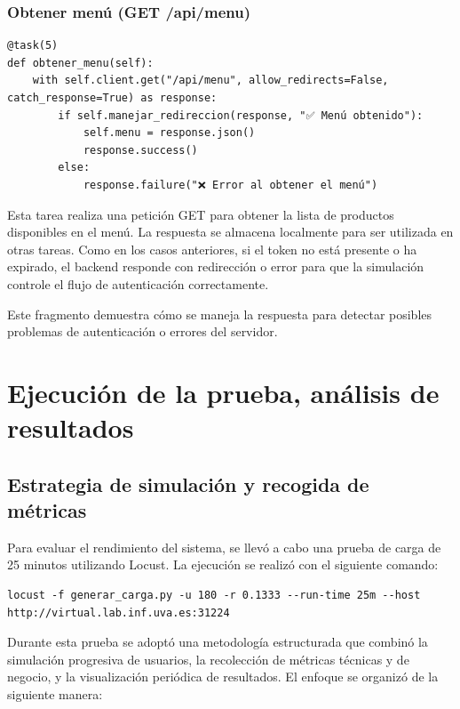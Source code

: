 \documentclass[10pt]{book}
\begin{document}
\subsubsection{Obtener menú (GET /api/menu)}

\begin{lstlisting}[style=pythonclean, caption={Tarea para obtener el menú de productos}]
@task(5)
def obtener_menu(self):
    with self.client.get("/api/menu", allow_redirects=False, catch_response=True) as response:
        if self.manejar_redireccion(response, "✅ Menú obtenido"):
            self.menu = response.json()
            response.success()
        else:
            response.failure("❌ Error al obtener el menú")
\end{lstlisting}

Esta tarea realiza una petición GET para obtener la lista de productos disponibles en el menú. La respuesta se almacena localmente para ser utilizada en otras tareas. Como en los casos anteriores, si el token no está presente o ha expirado, el backend responde con redirección o error para que la simulación controle el flujo de autenticación correctamente.


Este fragmento demuestra cómo se maneja la respuesta para detectar posibles problemas de autenticación o errores del servidor.

\section{Ejecución de la prueba, análisis de resultados}

\subsection{Estrategia de simulación y recogida de métricas}
\cite{xantygc_locust}
Para evaluar el rendimiento del sistema, se llevó a cabo una prueba de carga de 25 minutos utilizando Locust. La ejecución se realizó con el siguiente comando:

\begin{lstlisting}[style=simplebash]
locust -f generar_carga.py -u 180 -r 0.1333 --run-time 25m --host http://virtual.lab.inf.uva.es:31224
\end{lstlisting}

Durante esta prueba se adoptó una metodología estructurada que combinó la simulación progresiva de usuarios, la recolección de métricas técnicas y de negocio, y la visualización periódica de resultados. El enfoque se organizó de la siguiente manera:
\end{document}
